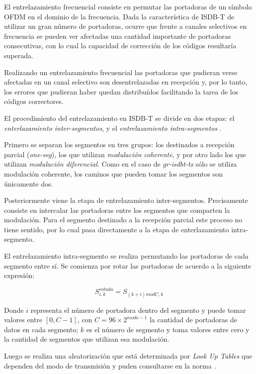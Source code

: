 El entrelazamiento frecuencial consiste en permutar las portadoras de un s\'imbolo OFDM en el dominio de la frecuencia. Dada la caracter\'istica de ISDB-T de utilizar un gran n\'umero de portadoras, ocurre que frente a canales selectivos en frecuencia se pueden ver afectadas una cantidad importante de portadoras consecutivas, con lo cual la capacidad de correcci\'on de los c\'odigos resultar\'ia superada.

Realizando un entrelazamiento frecuencial las portadoras que pudieran verse afectadas en un canal selectivo son desentrelazadas en recepci\'on y, por lo tanto, los errores que pudieran haber quedan distribu\'idos facilitando la tarea de los c\'odigos correctores.

El procedimiento del entrelazamiento en ISDB-T se divide en dos etapas: el \textit{enterlazamiento inter-segmentos}, y el \textit{entrelazamiento intra-segmentos }.

Primero se separan los segmentos en tres grupos: los destinados a recepci\'on parcial (\textit{one-seg}), los que utilizan \textit{modulación coherente}, y por otro lado los que utilizan \textit{modulación diferencial}. Como en el caso de \textit{gr-isdbt-tx} s\'olo se utiliza modulación coherente, los caminos que pueden tomar los segmentos son \'unicamente dos.

Posteriormente viene la etapa de entrelazamiento inter-segmentos. Precisamente consiste en intercalar las portadoras entre los segmentos que comparten la modulación. Para el segmento destinado a la recepci\'on parcial este proceso no tiene sentido, por lo cual pasa directamente a la etapa de enterlazamiento intra-segmento.

El entrelazamiento intra-segmento se realiza permutando las portadoras de cada segmento entre s\'i. Se comienza por rotar las portadoras de acuerdo a la siguiente expresi\'on:

\begin{equation}
S^{rotada}_{i,k} = S_{(k+i) mod C, k}
\end{equation}

Donde $i$ representa el número de portadora dentro del segmento y puede tomar valores entre $[0, C-1]$, con $C = 96 \times 2^{modo-1}$ la cantidad de portadoras de datos en cada segmento; $k$ es el número de segmento y toma valores entre cero y la cantidad de segmentos que utilizan esa modulación. 

Luego se realiza una aleatorización que est\'a determinada por \textit{Look Up Tables} que dependen del modo de transmisi\'on y puden consultarse en la norma \cite{norma}.

